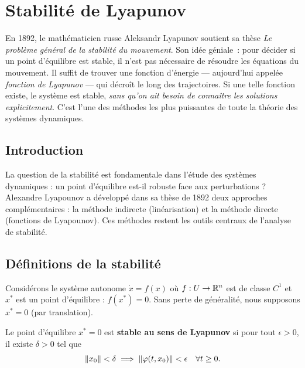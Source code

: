 \chapter{Stabilit\'e de Lyapunov}
\label{ch:lyapunov}

En 1892, le math\'ematicien russe Aleksandr Lyapunov soutient sa th\`ese
\emph{Le probl\`eme g\'en\'eral de la stabilit\'e du mouvement}. Son id\'ee
g\'eniale~: pour d\'ecider si un point d'\'equilibre est stable, il n'est pas
n\'ecessaire de r\'esoudre les \'equations du mouvement. Il suffit de trouver
une \og fonction d'\'energie\fg{} --- aujourd'hui appel\'ee \emph{fonction de
Lyapunov} --- qui d\'ecro\^it le long des trajectoires. Si une telle
fonction existe, le syst\`eme est stable, \emph{sans qu'on ait besoin de
conna\^itre les solutions explicitement}. C'est l'une des m\'ethodes les plus
puissantes de toute la th\'eorie des syst\`emes dynamiques.

\section{Introduction}

La question de la stabilit\'e est fondamentale dans l'\'etude des syst\`emes
dynamiques : un point d'\'equilibre est-il robuste face aux perturbations ?
Alexandre Lyapounov a d\'evelopp\'e dans sa th\`ese de 1892 deux approches
compl\'ementaires : la m\'ethode indirecte (lin\'earisation) et la m\'ethode
directe (fonctions de Lyapounov). Ces m\'ethodes restent les outils centraux
de l'analyse de stabilit\'e.

\section{D\'efinitions de la stabilit\'e}

Consid\'erons le syst\`eme autonome $\dot{x} = f(x)$ o\`u $f : U \to \mathbb{R}^n$
est de classe $C^1$ et $x^*$ est un point d'\'equilibre : $f(x^*) = 0$.
Sans perte de g\'en\'eralit\'e, nous supposons $x^* = 0$ (par translation).

\begin{definition}
Le point d'\'equilibre $x^* = 0$ est \textbf{stable au sens de Lyapunov} si
pour tout $\epsilon > 0$, il existe $\delta > 0$ tel que
\[
    \left\| x_0 \right\| < \delta \implies \left\| \varphi(t, x_0) \right\| < \epsilon
    \quad \forall t \geq 0.
\]
\end{definition}


